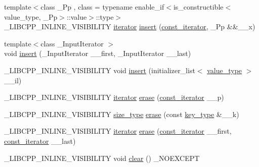 \begin{DoxyCompactItemize}
\item 
{\footnotesize template$<$class \+\_\+\+Pp , class  = typename enable\+\_\+if$<$is\+\_\+constructible$<$value\+\_\+type, \+\_\+\+Pp$>$\+::value$>$\+::type$>$ }\\\+\_\+\+L\+I\+B\+C\+P\+P\+\_\+\+I\+N\+L\+I\+N\+E\+\_\+\+V\+I\+S\+I\+B\+I\+L\+I\+T\+Y \hyperlink{class__map_a9ed817d33532f34fc46649b3fbe8e612}{iterator} \hyperlink{class__map_abf43f2f436ff26fdb81ce91d1525d6b4}{insert} (\hyperlink{class__map_ab0513968c2610ccf3b3fe070184396aa}{const\+\_\+iterator}, \+\_\+\+Pp \&\&\+\_\+\+\_\+x)
\item 
{\footnotesize template$<$class \+\_\+\+Input\+Iterator $>$ }\\void \hyperlink{class__map_a838cd8fb7ae542a85fcfe42287b7430b}{insert} (\+\_\+\+Input\+Iterator \+\_\+\+\_\+first, \+\_\+\+Input\+Iterator \+\_\+\+\_\+last)
\item 
\+\_\+\+L\+I\+B\+C\+P\+P\+\_\+\+I\+N\+L\+I\+N\+E\+\_\+\+V\+I\+S\+I\+B\+I\+L\+I\+T\+Y void \hyperlink{class__map_ae20302dd959504a835191f7a51b752ce}{insert} (initializer\+\_\+list$<$ \hyperlink{class__map_a840dcfbf8726d7ecdd0298ffc6afde52}{value\+\_\+type} $>$ \+\_\+\+\_\+il)
\item 
\+\_\+\+L\+I\+B\+C\+P\+P\+\_\+\+I\+N\+L\+I\+N\+E\+\_\+\+V\+I\+S\+I\+B\+I\+L\+I\+T\+Y \hyperlink{class__map_a9ed817d33532f34fc46649b3fbe8e612}{iterator} \hyperlink{class__map_a7b3649821bd3e861967b080be9a91e17}{erase} (\hyperlink{class__map_ab0513968c2610ccf3b3fe070184396aa}{const\+\_\+iterator} \+\_\+\+\_\+p)
\item 
\+\_\+\+L\+I\+B\+C\+P\+P\+\_\+\+I\+N\+L\+I\+N\+E\+\_\+\+V\+I\+S\+I\+B\+I\+L\+I\+T\+Y \hyperlink{class__map_adc37f621be25fda072b12873e60e9fc7}{size\+\_\+type} \hyperlink{class__map_a0e9f2537e7eeae72f28b86818a8e28ec}{erase} (const \hyperlink{class__map_a38e77c21e3aba60e817666c55ff61164}{key\+\_\+type} \&\+\_\+\+\_\+k)
\item 
\+\_\+\+L\+I\+B\+C\+P\+P\+\_\+\+I\+N\+L\+I\+N\+E\+\_\+\+V\+I\+S\+I\+B\+I\+L\+I\+T\+Y \hyperlink{class__map_a9ed817d33532f34fc46649b3fbe8e612}{iterator} \hyperlink{class__map_a4331a34f02d1d3723177fd0942a97857}{erase} (\hyperlink{class__map_ab0513968c2610ccf3b3fe070184396aa}{const\+\_\+iterator} \+\_\+\+\_\+first, \hyperlink{class__map_ab0513968c2610ccf3b3fe070184396aa}{const\+\_\+iterator} \+\_\+\+\_\+last)
\item 
\+\_\+\+L\+I\+B\+C\+P\+P\+\_\+\+I\+N\+L\+I\+N\+E\+\_\+\+V\+I\+S\+I\+B\+I\+L\+I\+T\+Y void \hyperlink{class__map_a49235449a634f18791048f3ef02968c2}{clear} () \+\_\+\+N\+O\+E\+X\+C\+E\+P\+T

\end{DoxyCompactItemize}
